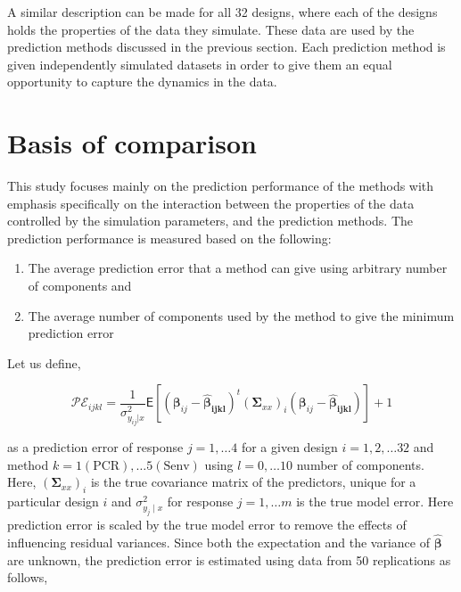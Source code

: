 \documentclass[review]{elsarticle}
\providecommand{\tightlist}{%
  \setlength{\itemsep}{0pt}\setlength{\parskip}{0pt}}
\begin{document}
A similar description can be made for all 32 designs, where each of the
designs holds the properties of the data they simulate. These data are
used by the prediction methods discussed in the previous section. Each
prediction method is given independently simulated datasets in order to
give them an equal opportunity to capture the dynamics in the data.

\section{Basis of comparison}\label{basis-of-comparison}

This study focuses mainly on the prediction performance of the methods
with emphasis specifically on the interaction between the properties of
the data controlled by the simulation parameters, and the prediction
methods. The prediction performance is measured based on the following:

\begin{enumerate}
\def\labelenumi{\alph{enumi})}
\tightlist
\item
  The average prediction error that a method can give using arbitrary
  number of components and
\item
  The average number of components used by the method to give the
  minimum prediction error
\end{enumerate}

Let us define,

\begin{equation}
\mathcal{PE}_{ijkl} = \frac{1}{\sigma_{y_{ij}|x}^2}
  \mathsf{E}{\left[\left(\boldsymbol{\beta}_{ij} -
  \boldsymbol{\hat{\beta}_{ijkl}}\right)^t
  \left(\boldsymbol{\Sigma}_{xx}\right)_i
  \left(\boldsymbol{\beta}_{ij} - \boldsymbol{\hat{\beta}_{ijkl}}\right)\right]} + 1
\label{eq:pred-error}
\end{equation}

as a prediction error of response \(j = 1, \ldots 4\) for a given design
\(i=1, 2, \ldots 32\) and method
\(k=1(\text{PCR}), \ldots 5(\text{Senv})\) using \(l=0, \ldots 10\)
number of components. Here, \(\left(\boldsymbol{\Sigma}_{xx}\right)_i\)
is the true covariance matrix of the predictors, unique for a particular
design \(i\) and \(\sigma_{y_j\mid x}^2\) for response
\(j = 1, \ldots m\) is the true model error. Here prediction error is
scaled by the true model error to remove the effects of influencing
residual variances. Since both the expectation and the variance of
\(\hat{\boldsymbol{\beta}}\) are unknown, the prediction error is
estimated using data from 50 replications as follows,
\end{document}
